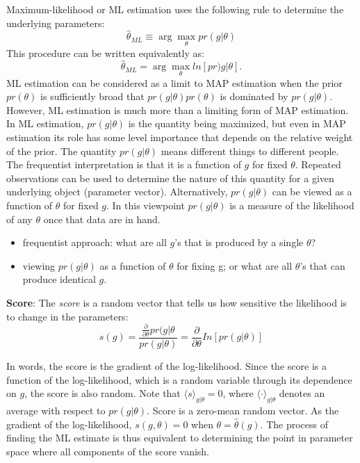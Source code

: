 Maximum-likelihood or ML estimation uses the following rule to determine the underlying parameters:
\begin{equation}
\hat{\theta}_{ML} \equiv \arg\max_{\theta} pr(g|\theta)
\end{equation}
This procedure can be written equivalently as:
\begin{equation}
\hat{\theta}_{ML} = \arg \max_{\theta} ln \left[ pr)g|\theta \right].
\end{equation}
ML estimation can be considered as a limit to MAP estimation when the prior $pr(\theta)$ is sufficiently broad that $pr(g|\theta) pr(\theta)$ is dominated by $pr(g|\theta)$.  However, ML estimation is much more than a limiting form of MAP estimation.
In ML estimation, $pr(g|\theta)$ is the quantity being maximized, but even in MAP estimation its role has some level importance that depends on the relative weight of the prior.  The quantity $pr(g|\theta)$ means different things to different people.  The frequentist interpretation is that it is a function of $g$ for fixed $\theta$.  Repeated observations can be used to determine the nature of this quantity for a given underlying object (parameter vector).  Alternatively, $pr(g|\theta)$ can be viewed as a function of $\theta$ for fixed $g$.  In this viewpoint $pr(g|\theta)$ is a measure of the likelihood of any $\theta$ once that data are in hand.  
\begin{itemize}
\item frequentist approach: what are all $g$'s that is produced by a single $\theta$?
\item viewing $pr(g|\theta)$ as a function of $\theta$ for fixing g; or what are all $\theta$'s that can produce identical $g$.
\end{itemize}

\noindent
\textbf{Score}: \medskip The \textit{score} is a random vector that tells us how sensitive the likelihood is to change in the parameters:
\begin{equation}
s(g) = \frac{\frac{\partial}{\partial \theta} pr(g|\theta}{pr(g|\theta)} = \frac{\partial}{\partial\theta} In \left[ pr(g|\theta) \right]
\end{equation}

In words, the score is the gradient of the log-likelihood. Since the score is a function of the log-likelihood, which is a random variable through its dependence on $g$, the score is also random.  Note that $\langle s \rangle_{g|\theta} = 0$, where $\langle \cdot \rangle_{g|\theta}$ denotes an average with respect to $pr(g|\theta)$. Score is a zero-mean random vector.
As the gradient of the log-likelihood, $s(g, \theta) = 0$ when $\theta = \hat{\theta}(g)$.  The process of finding the ML estimate is thus equivalent to determining the point in parameter space where all components of the score vanish.


